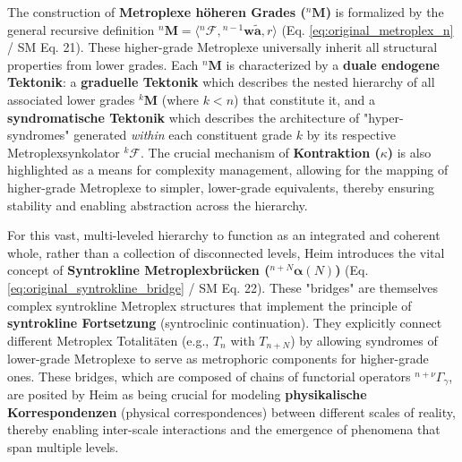 \documentclass[12pt]{article}
\newcommand{\metroplex}[1]{{}^{#1}\mathbf{M}}
\newcommand{\hypermetrophor}[1]{{}^{#1}\mathbf{w\widetilde{a}}}
\newcommand{\metroplexsynkolator}[1]{{}^{#1}\mathcal{F}}
\newcommand{\metroplextotalitaet}[1]{T_{#1}}
\newcommand{\syntroklinebruecke}[1]{{}^{#1}\bm{\alpha}}
\begin{document}
The construction of \textbf{Metroplexe höheren Grades (\( \metroplex{n} \))} is formalized by the general recursive definition \( \metroplex{n} = \langle \metroplexsynkolator{n}, \hypermetrophor{n-1}, r \rangle \) (Eq. \eqref{eq:original_metroplex_n} / SM Eq. 21). These higher-grade Metroplexe universally inherit all structural properties from lower grades. Each \( \metroplex{n} \) is characterized by a \textbf{duale endogene Tektonik}: a \textbf{graduelle Tektonik} which describes the nested hierarchy of all associated lower grades \( \metroplex{k} \) (where \( k<n \)) that constitute it, and a \textbf{syndromatische Tektonik} which describes the architecture of "hyper-syndromes" generated \textit{within} each constituent grade \(k\) by its respective Metroplexsynkolator \( \metroplexsynkolator{k} \). The crucial mechanism of \textbf{Kontraktion (\( \kappa \))} is also highlighted as a means for complexity management, allowing for the mapping of higher-grade Metroplexe to simpler, lower-grade equivalents, thereby ensuring stability and enabling abstraction across the hierarchy.

For this vast, multi-leveled hierarchy to function as an integrated and coherent whole, rather than a collection of disconnected levels, Heim introduces the vital concept of \textbf{Syntrokline Metroplexbrücken (\( \syntroklinebruecke{n+N}(N) \))} (Eq. \eqref{eq:original_syntrokline_bridge} / SM Eq. 22). These "bridges" are themselves complex syntrokline Metroplex structures that implement the principle of \textbf{syntrokline Fortsetzung} (syntroclinic continuation). They explicitly connect different Metroplex Totalitäten (e.g., \( \metroplextotalitaet{n} \) with \( \metroplextotalitaet{n+N} \)) by allowing syndromes of lower-grade Metroplexe to serve as metrophoric components for higher-grade ones. These bridges, which are composed of chains of functorial operators \( {}^{n+\nu}\Gamma_\gamma \), are posited by Heim as being crucial for modeling \textbf{physikalische Korrespondenzen} (physical correspondences) between different scales of reality, thereby enabling inter-scale interactions and the emergence of phenomena that span multiple levels.
\end{document}
